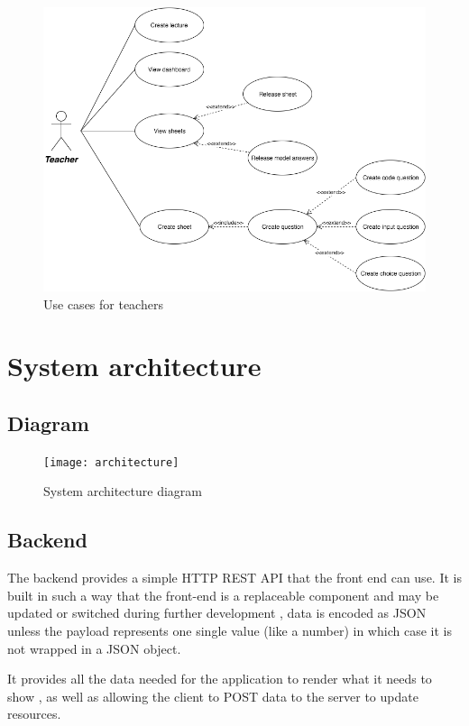 \begin{figure}[H]
  \centering

	\includegraphics[width=\textwidth,height=\textheight,keepaspectratio]{cases2}
	\caption{Use cases for teachers}
\end{figure}

\section{System architecture}

\subsection{Diagram}

\begin{figure}[H]
  \centering

	\texttt{[image: architecture]}
	\caption{System architecture diagram}
\end{figure}


\subsection{Backend}
The backend provides a simple HTTP REST API that the front end can use. It is built in such a way that the front-end is a replaceable component and may be updated or switched during further development , data is encoded as JSON unless the payload represents one single value (like a number) in which case it is not wrapped in a JSON object.

It provides all the data needed for the application to render what it needs to show , as well as allowing the client to POST data to the server to update resources.

